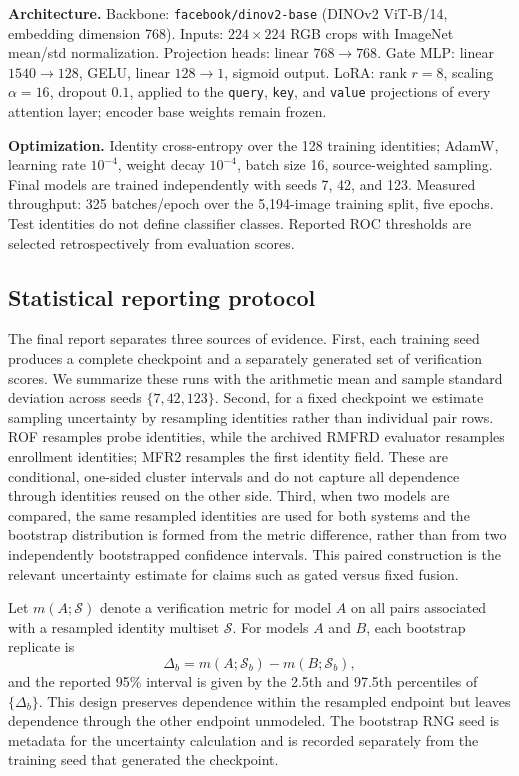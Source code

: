 \documentclass[10pt,journal,compsoc]{IEEEtran}
\begin{document}
\textbf{Architecture.} Backbone: \texttt{facebook/dinov2-base} (DINOv2 ViT-B/14, embedding dimension 768). Inputs: $224\times224$ RGB crops with ImageNet mean/std normalization. Projection heads: linear $768\rightarrow768$. Gate MLP: linear $1540\rightarrow128$, GELU, linear $128\rightarrow1$, sigmoid output. LoRA: rank $r=8$, scaling $\alpha=16$, dropout $0.1$, applied to the \texttt{query}, \texttt{key}, and \texttt{value} projections of every attention layer; encoder base weights remain frozen.

\textbf{Optimization.} Identity cross-entropy over the 128 training identities; AdamW, learning rate $10^{-4}$, weight decay $10^{-4}$, batch size 16, source-weighted sampling. Final models are trained independently with seeds 7, 42, and 123. Measured throughput: 325 batches/epoch over the 5,194-image training split, five epochs. Test identities do not define classifier classes. Reported ROC thresholds are selected retrospectively from evaluation scores.

\subsection{Statistical reporting protocol}
The final report separates three sources of evidence. First, each training seed produces a complete checkpoint and a separately generated set of verification scores. We summarize these runs with the arithmetic mean and sample standard deviation across seeds $\{7,42,123\}$. Second, for a fixed checkpoint we estimate sampling uncertainty by resampling identities rather than individual pair rows. ROF resamples probe identities, while the archived RMFRD evaluator resamples enrollment identities; MFR2 resamples the first identity field. These are conditional, one-sided cluster intervals and do not capture all dependence through identities reused on the other side. Third, when two models are compared, the same resampled identities are used for both systems and the bootstrap distribution is formed from the metric difference, rather than from two independently bootstrapped confidence intervals. This paired construction is the relevant uncertainty estimate for claims such as gated versus fixed fusion.

Let $m(A;\mathcal{S})$ denote a verification metric for model $A$ on all pairs associated with a resampled identity multiset $\mathcal{S}$. For models $A$ and $B$, each bootstrap replicate is
\begin{equation}
 \Delta_b=m(A;\mathcal{S}_b)-m(B;\mathcal{S}_b),
\end{equation}
and the reported 95\% interval is given by the 2.5th and 97.5th percentiles of $\{\Delta_b\}$. This design preserves dependence within the resampled endpoint but leaves dependence through the other endpoint unmodeled. The bootstrap RNG seed is metadata for the uncertainty calculation and is recorded separately from the training seed that generated the checkpoint.
\end{document}
